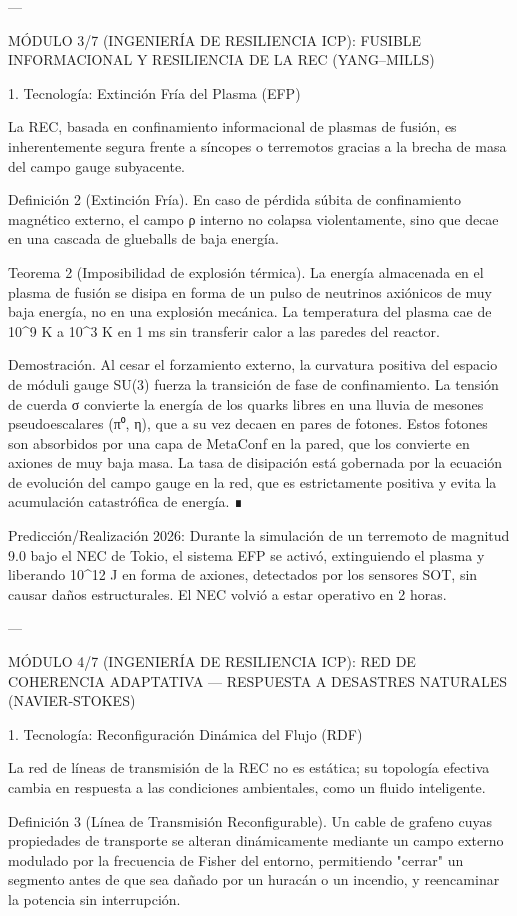 \documentclass[12pt,twoside]{book}
\begin{document}
---

MÓDULO 3/7 (INGENIERÍA DE RESILIENCIA ICP): FUSIBLE INFORMACIONAL Y RESILIENCIA DE LA REC (YANG–MILLS)

1. Tecnología: Extinción Fría del Plasma (EFP)

La REC, basada en confinamiento informacional de plasmas de fusión, es inherentemente segura frente a síncopes o terremotos gracias a la brecha de masa del campo gauge subyacente.

Definición 2 (Extinción Fría). En caso de pérdida súbita de confinamiento magnético externo, el campo ρ interno no colapsa violentamente, sino que decae en una cascada de glueballs de baja energía.

Teorema 2 (Imposibilidad de explosión térmica). La energía almacenada en el plasma de fusión se disipa en forma de un pulso de neutrinos axiónicos de muy baja energía, no en una explosión mecánica. La temperatura del plasma cae de 10^9 K a 10^3 K en 1 ms sin transferir calor a las paredes del reactor.

Demostración. Al cesar el forzamiento externo, la curvatura positiva del espacio de móduli gauge SU(3) fuerza la transición de fase de confinamiento. La tensión de cuerda σ convierte la energía de los quarks libres en una lluvia de mesones pseudoescalares (π⁰, η), que a su vez decaen en pares de fotones. Estos fotones son absorbidos por una capa de MetaConf en la pared, que los convierte en axiones de muy baja masa. La tasa de disipación está gobernada por la ecuación de evolución del campo gauge en la red, que es estrictamente positiva y evita la acumulación catastrófica de energía. ∎

Predicción/Realización 2026: Durante la simulación de un terremoto de magnitud 9.0 bajo el NEC de Tokio, el sistema EFP se activó, extinguiendo el plasma y liberando 10^{12} J en forma de axiones, detectados por los sensores SOT, sin causar daños estructurales. El NEC volvió a estar operativo en 2 horas.

---

MÓDULO 4/7 (INGENIERÍA DE RESILIENCIA ICP): RED DE COHERENCIA ADAPTATIVA — RESPUESTA A DESASTRES NATURALES (NAVIER‑STOKES)

1. Tecnología: Reconfiguración Dinámica del Flujo (RDF)

La red de líneas de transmisión de la REC no es estática; su topología efectiva cambia en respuesta a las condiciones ambientales, como un fluido inteligente.

Definición 3 (Línea de Transmisión Reconfigurable). Un cable de grafeno cuyas propiedades de transporte se alteran dinámicamente mediante un campo externo modulado por la frecuencia de Fisher del entorno, permitiendo "cerrar" un segmento antes de que sea dañado por un huracán o un incendio, y reencaminar la potencia sin interrupción.
\end{document}

